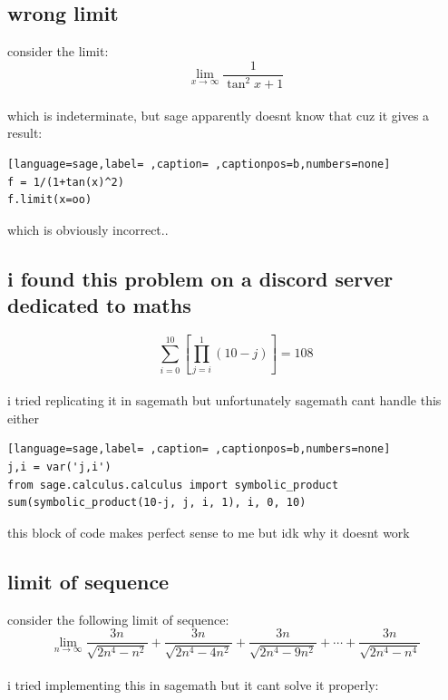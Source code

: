 \documentclass[a4paper,12pt]{article}
\begin{document}
\subsection{wrong limit}
\label{sec:org2ac9eaf}

consider the limit:\\[0pt]
\[
  \lim_{x\to\infty} \frac{1}{\tan^2 x + 1}
\]\\[0pt]
which is indeterminate, but sage apparently doesnt know that cuz it gives a result:\\[0pt]

\begin{lstlisting}[language=sage,label= ,caption= ,captionpos=b,numbers=none]
f = 1/(1+tan(x)^2)
f.limit(x=oo)
\end{lstlisting}
which is obviously incorrect..\\[0pt]

\subsection{i found this problem on a discord server dedicated to maths}
\label{sec:org8386708}

\[ \sum_{i=0}^{10}\left[\prod_{j=i}^{1}(10-j)\right] = 108 \]\\[0pt]

i tried replicating it in sagemath but unfortunately sagemath cant handle this either\\[0pt]

\begin{lstlisting}[language=sage,label= ,caption= ,captionpos=b,numbers=none]
j,i = var('j,i')
from sage.calculus.calculus import symbolic_product
sum(symbolic_product(10-j, j, i, 1), i, 0, 10)
\end{lstlisting}

this block of code makes perfect sense to me but idk why it doesnt work\\[0pt]

\subsection{limit of sequence}
\label{sec:org8445276}

consider the following limit of sequence:\\[0pt]
\[
  \lim_{n\to\infty} \frac{3n}{\sqrt{2n^4-n^2}} + \frac{3n}{\sqrt{2n^4-4n^2}} + \frac{3n}{\sqrt{2n^4-9n^2}} + \cdots + \frac{3n}{\sqrt{2n^4-n^4}} 
\]\\[0pt]
i tried implementing this in sagemath but it cant solve it properly:\\[0pt]
\end{document}
